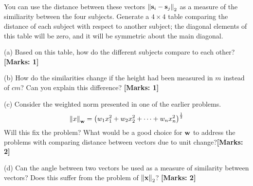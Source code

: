 \documentclass[12pt]{article}
\def\mf{\ensuremath\mathbf}
\begin{document}
\begin{enumerate}
    You can use the distance between these vectors $\left\lVert \mf{s}_i - \mf{s}_j\right\rVert_2$ as a measure of the similiarity between the four subjects. Generate a $4 \times 4$ table comparing the distance of each subject with respect to another subject; the diagonal elements of this table will be zero, and it will be symmetric about the main diagonal. 

    (a) Based on this table, how do the different subjects compare to each other?  \textbf{[Marks: 1]}

    (b) How do the similarities change if the height had been measured in $m$ instead of $cm$? Can you explain this difference?  \textbf{[Marks: 1]}

    (c) Consider the weighted norm presented in one of the earlier problems.  
    \[ \left\lVert x \right\rVert_\mf{w} = \left(w_1 x_1^2 + w_2 x_2^2 + \cdots + w_n x_n^2\right)^{\frac{1}{2}} \]
    Will this fix the problem? What would be a good choice for $\mf{w}$ to address the problems with comparing distance between vectors due to unit change?\textbf{[Marks: 2]}

    (d) Can the angle between two vectors be used as a measure of similarity between vectors? Does this suffer from the problem of $\left\lVert \mf{x} \right\rVert_2$?  \textbf{[Marks: 2]}
\end{enumerate}
\end{document}
